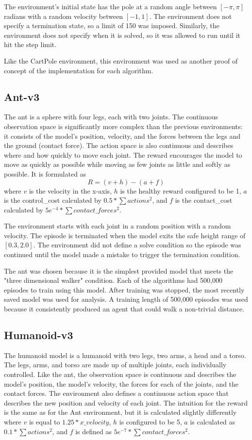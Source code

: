 \documentclass[conference]{IEEEtran}
\begin{document}
The environment's initial state has the pole at a random angle between $[-\pi, \pi]$ radians with a random velocity between $[-1, 1]$. The environment does not specify a termination state, so a limit of 150 was imposed. Similarly, the environment does not specify when it is solved, so it was allowed to run until it hit the step limit.

Like the CartPole environment, this environment was used as another proof of concept of the implementation for each algorithm.

\subsection{Ant-v3}

The ant is a sphere with four legs, each with two joints. The continuous observation space is significantly more complex than the previous environments: it consists of the model's position, velocity, and the forces between the legs and the ground (contact force). The action space is also continuous and describes where and how quickly to move each joint. The reward encourages the model to move as quickly as possible while moving as few joints as little and softly as possible. It is formulated as
$$
    R = (v + h) - (a + f)
$$
where $v$ is the velocity in the x-axis, $h$ is the healthy reward configured to be 1, $a$ is the control\_cost calculated by $0.5* \sum actions^{2}$, and $f$ is the contact\_cost calculated by $5e^{-4} * \sum contact\_forces^{2}$.

The environment starts with each joint in a random position with a random velocity. The episode is terminated when the model exits the safe height range of $[0.3, 2.0]$. The environment did not define a solve condition so the episode was continued until the model made a mistake to trigger the termination condition.

The ant was chosen because it is the simplest provided model that meets the "three dimensional walker" condition. Each of the algorithms had 500,000 episodes to train using this model. After training was stopped, the most recently saved model was used for analysis. A training length of 500,000 episodes was used because it consistently produced an agent that could walk a non-trivial distance.

\subsection{Humanoid-v3}

The humanoid model is a humanoid with two legs, two arms, a head and a torso. The legs, arms, and torso are made up of multiple joints, each individually controlled. Like the ant, the observation space is continuous and describes the model's position, the model's velocity, the forces for each of the joints, and the contact forces. The environment also defines a continuous action space that describes the new position and velocity of each joint. The intuition for the reward is the same as for the Ant environment, but it is calculated slightly differently where $v$ is equal to $1.25 * x\_velocity$, $h$ is configured to be 5, $a$ is calculated as $0.1 * \sum actions^{2}$, and $f$ is defined as $5e^{-7} * \sum contact\_forces^{2}$.
\end{document}
